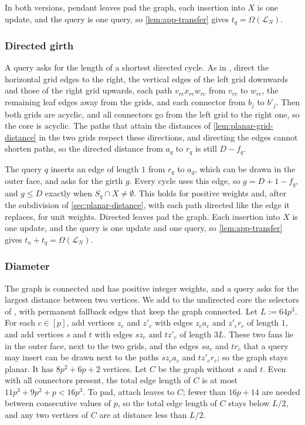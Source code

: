 In both versions, pendant leaves pad the graph, each insertion into $X$ is one update, and the query is one query, so \cref{lem:app-transfer} gives $t_q=\Omega(\mathcal L_N)$.

\subsubsection{Directed girth}\label{sec:planar-girth}

A query asks for the length of a shortest directed cycle. As in \cite[Section~6]{abboud_popular_2016}, direct the horizontal grid edges to the right, the vertical edges of the left grid downwards and those of the right grid upwards, each path $v_{rc}x_{rc}w_{rc}$ from $v_{rc}$ to $w_{rc}$, the remaining leaf edges away from the grids, and each connector from $b_j$ to $b'_j$. Then both grids are acyclic, and all connectors go from the left grid to the right one, so the core is acyclic. The paths that attain the distances of \cref{lem:planar-grid-distance} in the two grids respect these directions, and directing the edges cannot shorten paths, so the directed distance from $a_q$ to $r_q$ is still $D-f_q$.

The query $q$ inserts an edge of length $1$ from $r_q$ to $a_q$, which can be drawn in the outer face, and asks for the girth $g$. Every cycle uses this edge, so $g=D+1-f_q$, and $g\le D$ exactly when $S_q\cap X\ne\emptyset$. This holds for positive weights and, after the subdivision of \cref{sec:planar-distance}, with each path directed like the edge it replaces, for unit weights. Directed leaves pad the graph. Each insertion into $X$ is one update, and the query is one update and one query, so \cref{lem:app-transfer} gives $t_u+t_q=\Omega(\mathcal L_N)$.

\subsubsection{Diameter}\label{sec:planar-diameter}

The graph is connected and has positive integer weights, and a query asks for the largest distance between two vertices. We add to the undirected core the selectors of \cite[Section~6]{abboud_popular_2016}, with permanent fallback edges that keep the graph connected. Let $L:=64p^3$. For each $c\in[p]$, add vertices $z_c$ and $z'_c$ with edges $z_ca_c$ and $z'_cr_c$ of length $1$, and add vertices $s$ and $t$ with edges $sz_c$ and $tz'_c$ of length $3L$. These two fans lie in the outer face, next to the two grids, and the edges $sa_c$ and $tr_c$ that a query may insert can be drawn next to the paths $sz_ca_c$ and $tz'_cr_c$; so the graph stays planar. It has $8p^2+6p+2$ vertices. Let $C$ be the graph without $s$ and $t$. Even with all connectors present, the total edge length of $C$ is at most $11p^3+9p^2+p<16p^3$. To pad, attach leaves to $C$; fewer than $16p+14$ are needed between consecutive values of $p$, so the total edge length of $C$ stays below $L/2$, and any two vertices of $C$ are at distance less than $L/2$.

